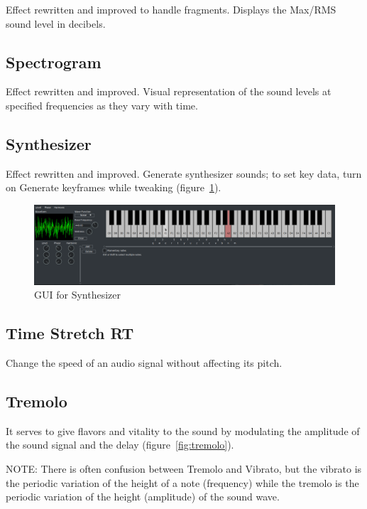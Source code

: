 Effect rewritten and improved to handle fragments. Displays the Max/RMS sound level in decibels.

\subsection{Spectrogram}%
\label{sub:Spectrogram}

Effect rewritten and improved. Visual representation of the sound levels at specified frequencies as they vary with time.

\subsection{Synthesizer}%
\label{sub:Synthesizer}

Effect rewritten and improved. Generate synthesizer sounds; to set key data, turn on Generate keyframes while tweaking (figure~\ref{fig:synthesizer}).

\begin{figure}[htpb]
    \centering
    \includegraphics[width=1.0\linewidth]{images/synthesizer.png}
    \caption{GUI for Synthesizer}
    \label{fig:synthesizer}
\end{figure}

\subsection{Time Stretch RT}%
\label{sub:time_stretch_rt}

Change the speed of an audio signal without affecting its pitch.

\subsection{Tremolo}%
\label{sub:tremolo}

It serves to give flavors and vitality to the sound by modulating the amplitude of the sound signal and the delay (figure~\ref{fig:tremolo}).

NOTE: There is often confusion between Tremolo and Vibrato, but the vibrato is the periodic variation of the height of a note (frequency) while the tremolo is the periodic variation of the height (amplitude) of the sound wave.

